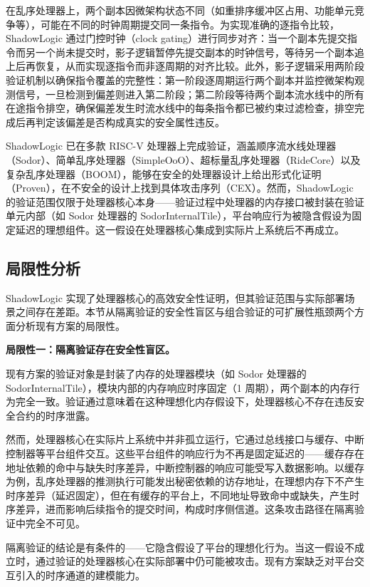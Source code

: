 在乱序处理器上，两个副本因微架构状态不同（如重排序缓冲区占用、功能单元竞争等），可能在不同的时钟周期提交同一条指令。为实现准确的逐指令比较，ShadowLogic 通过门控时钟（clock gating）进行同步对齐：当一个副本先提交指令而另一个尚未提交时，影子逻辑暂停先提交副本的时钟信号，等待另一个副本追上后再恢复，从而实现逐指令而非逐周期的对齐比较。此外，影子逻辑采用两阶段验证机制以确保指令覆盖的完整性：第一阶段逐周期运行两个副本并监控微架构观测信号，一旦检测到偏差则进入第二阶段；第二阶段等待两个副本流水线中的所有在途指令排空，确保偏差发生时流水线中的每条指令都已被约束过滤检查，排空完成后再判定该偏差是否构成真实的安全属性违反。

ShadowLogic 已在多款 RISC-V 处理器上完成验证，涵盖顺序流水线处理器（Sodor）、简单乱序处理器（SimpleOoO）、超标量乱序处理器（RideCore）以及复杂乱序处理器（BOOM），能够在安全的处理器设计上给出形式化证明（Proven），在不安全的设计上找到具体攻击序列（CEX）。然而，ShadowLogic 的验证范围仅限于处理器核心本身——验证过程中处理器的内存接口被封装在验证单元内部（如 Sodor 处理器的 SodorInternalTile），平台响应行为被隐含假设为固定延迟的理想组件。这一假设在处理器核心集成到实际片上系统后不再成立。

\subsection{局限性分析}
\label{subsec:ch4_limitations}

ShadowLogic 实现了处理器核心的高效安全性证明，但其验证范围与实际部署场景之间存在差距。本节从隔离验证的安全性盲区与组合验证的可扩展性瓶颈两个方面分析现有方案的局限性。

\textbf{局限性一：隔离验证存在安全性盲区。}

现有方案的验证对象是封装了内存的处理器模块（如 Sodor 处理器的 SodorInternalTile），模块内部的内存响应时序固定（1 周期），两个副本的内存行为完全一致。验证通过意味着在这种理想化内存假设下，处理器核心不存在违反安全合约的时序泄露。

然而，处理器核心在实际片上系统中并非孤立运行，它通过总线接口与缓存、中断控制器等平台组件交互。这些平台组件的响应行为不再是固定延迟的——缓存存在地址依赖的命中与缺失时序差异，中断控制器的响应可能受写入数据影响。以缓存为例，乱序处理器的推测执行可能发出秘密依赖的访存地址，在理想内存下不产生时序差异（延迟固定），但在有缓存的平台上，不同地址导致命中或缺失，产生时序差异，进而影响后续指令的提交时间，构成时序侧信道。这条攻击路径在隔离验证中完全不可见。

隔离验证的结论是有条件的——它隐含假设了平台的理想化行为。当这一假设不成立时，通过验证的处理器核心在实际部署中仍可能被攻击。现有方案缺乏对平台交互引入的时序通道的建模能力。

